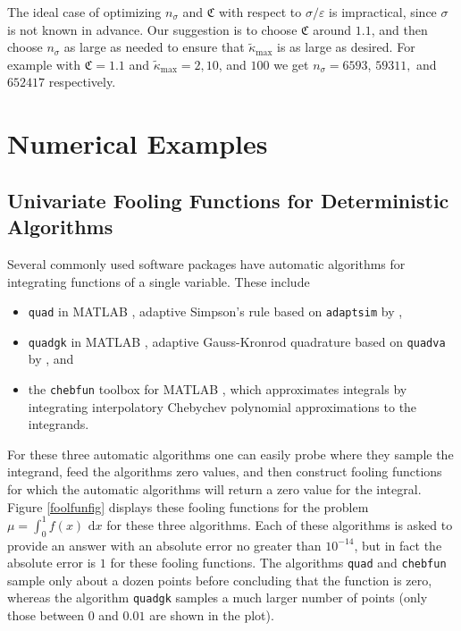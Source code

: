 \documentclass[graybox]{svmult}
\newcommand{\fudge}{\mathfrak{C}}
\newcommand{\rd}{\,\mathrm{d}}
\newcommand{\dif}{\rd}
\newcommand{\tkappa}{\tilde{\kappa}}
\begin{document}
The ideal case of optimizing $n_\sigma$ and $\fudge$ with respect to $\sigma/\varepsilon$ is impractical, since $\sigma$ is not known in advance.  Our suggestion is to choose $\fudge$ around $1.1$, and then choose $n_\sigma$ as large as needed to ensure that $\tkappa_{\max}$ is as large as desired. For example with  $\fudge = 1.1$ and 
$\tkappa_{\max} = 2, 10$, and $100$
we get $n_\sigma = 6593$, $59311,$ and $652417$ respectively.

\section{Numerical Examples} \label{numerexsec}

\subsection{Univariate Fooling Functions for Deterministic Algorithms}

Several commonly used software packages have automatic algorithms for integrating functions of a single variable.  These include 
\begin{itemize} 

\item {\tt quad} in MATLAB \citep{MAT7.12}, adaptive Simpson's rule based on {\tt adaptsim} by \cite{GanGau00a},

\item {\tt quadgk} in MATLAB \citep{MAT7.12}, adaptive Gauss-Kronrod quadrature based on {\tt quadva} by \cite{Sha08a}, and

\item the {\tt chebfun} \citep{TrefEtal12} toolbox for MATLAB \citep{MAT7.12}, which approximates integrals by integrating interpolatory Chebychev polynomial approximations to the integrands.


\end{itemize}

For these three automatic algorithms one can easily probe where they sample the integrand, feed the algorithms zero values, and then construct fooling functions for which the automatic algorithms will return a zero value for the integral.  Figure \ref{foolfunfig} displays these fooling functions for the problem $\mu=\int_0^1 f(x) \, \dif x$ for these three algorithms. Each of these algorithms is asked to provide an answer with an absolute error no greater than $10^{-14}$, but in fact the absolute error is $1$ for these fooling functions.  The algorithms {\tt quad} and {\tt chebfun} sample only about a dozen points before concluding that the function is zero, whereas the algorithm {\tt quadgk} samples a much larger number of points (only those between $0$ and $0.01$ are shown in the plot). 
\end{document}
